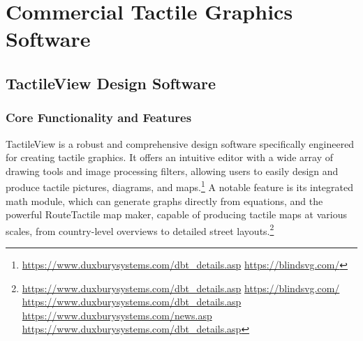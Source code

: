 \section{Commercial Tactile Graphics Software}

\subsection{TactileView Design Software}

\subsubsection{Core Functionality and Features}

TactileView is a robust and comprehensive design software specifically engineered for creating tactile graphics. It offers an intuitive editor with a wide array of drawing tools and image processing filters, allowing users to easily design and produce tactile pictures, diagrams, and maps.\footnote{\url{https://www.duxburysystems.com/dbt_details.asp} \url{https://blindsvg.com/}} A notable feature is its integrated math module, which can generate graphs directly from equations, and the powerful RouteTactile map maker, capable of producing tactile maps at various scales, from country-level overviews to detailed street layouts.\footnote{\url{https://www.duxburysystems.com/dbt_details.asp} \url{https://blindsvg.com/} \url{https://www.duxburysystems.com/dbt_details.asp} \url{https://www.duxburysystems.com/news.asp} \url{https://www.duxburysystems.com/dbt_details.asp}}

